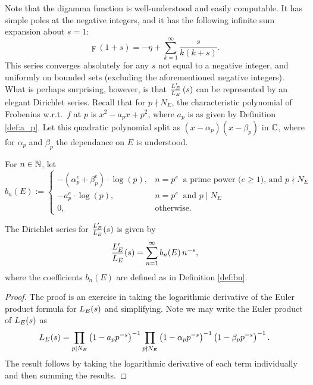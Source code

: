 Note that the digamma function is well-understood and easily computable. It has simple poles at the negative integers, and it has the following infinite sum expansion about $s=1$:
\begin{equation}\label{eqn:digamma_sum}
\digamma(1+s) = -\eta + \sum_{k=1}^{\infty} \frac{s}{k(k+s)}.
\end{equation}
This series converges absolutely for any $s$ not equal to a negative integer, and uniformly on bounded sets (excluding the aforementioned negative integers).\\

What is perhaps surprising, however, is that $\frac{L_E^{\prime}}{L_E}\left(s\right)$ can be represented by an elegant Dirichlet series. Recall that for $p \nmid N_E$, the characteristic polynomial of Frobenius w.r.t.~$f$ at $p$ is $x^2 - a_p x + p^2$, where $a_p$ is as given by Definition \ref{def:a_p}. Let this quadratic polynomial split as $(x-\alpha_p)(x-\beta_p)$ in $\mathbb{C}$, where for $\alpha_p$ and $\beta_p$ the dependance on $E$ is understood. \\

\begin{definition}\label{def:bn}
For $n \in \mathbb{N}$, let
\begin{equation}
b_n(E) := \begin{cases}
-\left(\alpha_p^e+\beta_p^e\right)\cdot \log(p), & n=p^e\;\;\text{a prime power ($e\ge1$), and $p \nmid N_E$} \\
-a_p^e \cdot \log(p), & n=p^e\;\;\text{and $p \mid N_E$} \\
0, & \text{otherwise.} \end{cases}
\end{equation}
\end{definition}

\begin{lemma}
The Dirichlet series for $\frac{L_E^{\prime}}{L_E}(s)$ is given by
\begin{equation}
\frac{L_E^{\prime}}{L_E}(s) = \sum_{n=1}^{\infty} b_n(E)\, n^{-s},
\end{equation}
where the coefficients $b_n(E)$ are defined as in Definition \ref{def:bn}. \\
\end{lemma}
\begin{proof}
The proof is an exercise in taking the logarithmic derivative of the Euler product formula for $L_E(s)$ and simplifying. Note we may write the Euler product of $L_E(s)$ as
\begin{equation}
L_E(s) = \prod_{p|N_E} \left(1-a_p p^{-s}\right)^{-1} \prod_{p\nmid N_E} \left(1-\alpha_p p^{-s}\right)^{-1}\left(1-\beta_p p^{-s}\right)^{-1}.
\end{equation}
The result follows by taking the logarithmic derivative of each term individually and then summing the results.
\end{proof}

